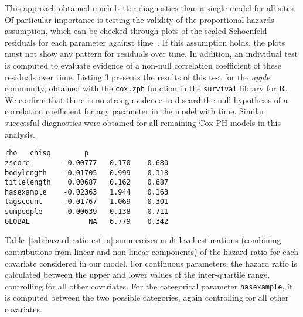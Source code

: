 \documentclass{chi2012}
\begin{document}
This approach obtained much better diagnostics than a single model for all sites.
Of particular importance is testing the validity of the proportional hazards
assumption, which can be checked through plots of the scaled Schoenfeld
residuals for each parameter against time~\cite{mills2011}. If this assumption
holds, the plots must not show any pattern for residuals over time. In addition,
an individual test is computed to evaluate evidence of a non-null correlation
coefficient of these residuals over time. Listing 3 presents the results of this
test for the \textit{apple} community, obtained with the \texttt{cox.zph} function
in the \texttt{survival} library for R. We confirm that there is no strong evidence
to discard the null hypothesis of a correlation coefficient  for any
parameter in the model with time. Similar successful diagnostics were obtained for all 
remaining Cox PH models in this analysis.

\begin{lstlisting}[breaklines=true,
caption={Model formulation to fit a Cox PH model for each site using the 
\texttt{cph} function in the \texttt{rms} package in R.},
basicstyle=\ttfamily\scriptsize,
frame=lines,
showtabs=false,
showspaces=false,
showstringspaces=false,
captionpos=b]
                   rho   chisq        p
zscore        -0.00777   0.170    0.680
bodylength    -0.01705   0.999    0.318
titlelength    0.00687   0.162    0.687
hasexample    -0.02363   1.944    0.163
tagscount     -0.01767   1.069    0.301
sumpeople      0.00639   0.138    0.711
GLOBAL              NA   6.779    0.342
\end{lstlisting}

Table~\ref{tab:hazard-ratio-estim} summarizes multilevel estimations (combining
contributions from linear and non-linear components) of the hazard ratio for each 
covariate considered in our model. For continuous parameters, the hazard ratio is 
calculated between the upper and lower values of the inter-quartile range, controlling
for all other covariates. For the categorical parameter \texttt{hasexample}, it is
computed between the two possible categories, again controlling for all
other covariates.
\end{document}
